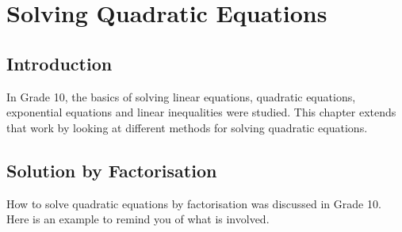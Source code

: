 \chapter{Solving Quadratic Equations}
\label{m:se:q11}


\section{Introduction}
In Grade 10, the basics of solving linear equations, quadratic
equations, exponential equations and linear inequalities were
studied. This chapter extends that work by looking at different
methods for solving quadratic equations.


\section{Solution by Factorisation}

How to solve quadratic equations by factorisation was discussed in Grade 10. Here is an example to remind you of what is involved.

